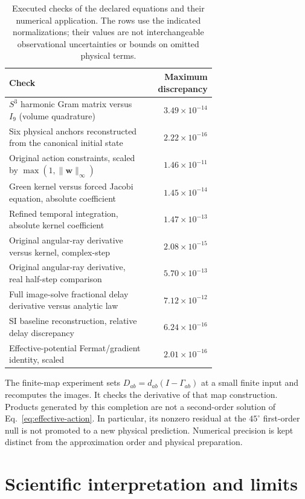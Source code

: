 \documentclass[11pt,a4paper]{article}
\begin{document}
\begin{table}[tbp]
\centering\small
\begin{tabular}{p{0.68\linewidth}r}
\toprule
Check & Maximum discrepancy\\
\midrule
$S^3$ harmonic Gram matrix versus $I_9$ (volume quadrature)
 & $3.49\times10^{-14}$\\
Six physical anchors reconstructed from the canonical initial state
 & $2.22\times10^{-16}$\\
Original action constraints, scaled by $\max(1,\|\boldsymbol w\|_\infty)$
 & $1.46\times10^{-11}$\\
Green kernel versus forced Jacobi equation, absolute coefficient
 & $1.45\times10^{-14}$\\
Refined temporal integration, absolute kernel coefficient
 & $1.47\times10^{-13}$\\
Original angular-ray derivative versus kernel, complex-step
 & $2.08\times10^{-15}$\\
Original angular-ray derivative, real half-step comparison
 & $5.70\times10^{-13}$\\
Full image-solve fractional delay derivative versus analytic law
 & $7.12\times10^{-12}$\\
SI baseline reconstruction, relative delay discrepancy
 & $6.24\times10^{-16}$\\
Effective-potential Fermat/gradient identity, scaled
 & $2.01\times10^{-16}$\\
\bottomrule
\end{tabular}
\caption{Executed checks of the declared equations and their numerical
application. The rows use the indicated normalizations; their values
are not interchangeable observational uncertainties or bounds on
omitted physical terms.}
\label{tab:verification}
\end{table}

The finite-map experiment sets $D_{ab}=d_{ab}(I-\Gamma_{ab})$ at a
small finite input and recomputes the images. It checks the derivative
of that map construction. Products generated by this completion are
not a second-order solution of Eq.~\eqref{eq:effective-action}.
In particular, its nonzero residual at the $45^\circ$ first-order null
is not promoted to a new physical prediction. Numerical precision is
kept distinct from the approximation order and physical preparation.

\section{Scientific interpretation and limits}
\label{sec:discussion}
\end{document}
